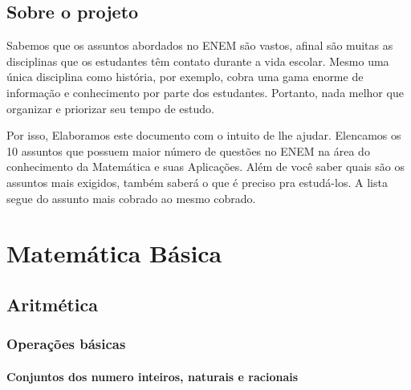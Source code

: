 \documentclass[11pt,fleqn]{book} %
\begin{document}



\pagestyle{empty} %

\tableofcontents %

\cleardoublepage %

\pagestyle{fancy} %


\chapter{Sobre o projeto}
Sabemos que os assuntos abordados no ENEM são vastos, afinal são muitas as disciplinas que os estudantes têm contato durante a vida escolar. Mesmo uma única disciplina como história, por exemplo, cobra uma gama enorme de informação e conhecimento por parte dos estudantes. Portanto, nada melhor que organizar e priorizar seu tempo de estudo.

Por isso, Elaboramos este documento com o intuito de lhe ajudar. Elencamos os 10 assuntos que possuem maior número de questões no ENEM na área do conhecimento da Matemática e suas Aplicações. Além de você saber quais são os assuntos mais exigidos, também saberá o que é preciso pra estudá-los. A lista segue do assunto mais cobrado ao mesmo cobrado.


\part{Matemática Básica}


\chapter{Aritmética}
    \section{Operações básicas }
    \subsection{Conjuntos dos numero inteiros, naturais e racionais}
\end{document}
